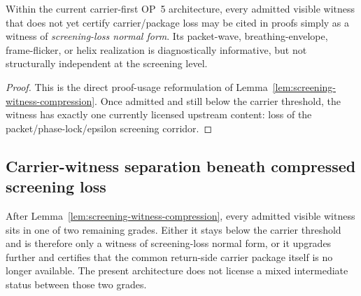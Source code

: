 \begin{corollary}
\label{cor:screening-witness-normal-form}
Within the current carrier-first OP~5 architecture, every admitted visible witness that does not yet certify carrier/package loss may be cited in proofs simply as a witness of \emph{screening-loss normal form}. Its packet-wave, breathing-envelope, frame-flicker, or helix realization is diagnostically informative, but not structurally independent at the screening level.
\end{corollary}

\begin{proof}
This is the direct proof-usage reformulation of Lemma~\ref{lem:screening-witness-compression}. Once admitted and still below the carrier threshold, the witness has exactly one currently licensed upstream content: loss of the packet/phase-lock/epsilon screening corridor.
\end{proof}


\subsection{Carrier-witness separation beneath compressed screening loss}
\label{sec:carrier-witness-separation}

\begin{remark}
After Lemma~\ref{lem:screening-witness-compression}, every admitted visible witness sits in one of two remaining grades. Either it stays below the carrier threshold and is therefore only a witness of screening-loss normal form, or it upgrades further and certifies that the common return-side carrier package itself is no longer available. The present architecture does not license a mixed intermediate status between those two grades.
\end{remark}

